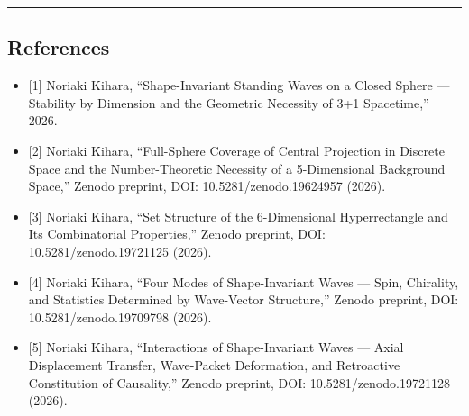 \documentclass[
  a4paper,11pt]{article}
\providecommand{\tightlist}{%
  \setlength{\itemsep}{0pt}\setlength{\parskip}{0pt}}
\theoremstyle{definition}
\theoremstyle{remark}
\begin{document}
\begin{center}\rule{0.5\linewidth}{0.5pt}\end{center}

\subsection{References}\label{references}

\begin{itemize}
\tightlist
\item
  {[}1{]} Noriaki Kihara, ``Shape-Invariant Standing Waves on a Closed
  Sphere --- Stability by Dimension and the Geometric Necessity of 3+1
  Spacetime,'' 2026.
\item
  {[}2{]} Noriaki Kihara, ``Full-Sphere Coverage of Central Projection
  in Discrete Space and the Number-Theoretic Necessity of a
  5-Dimensional Background Space,'' Zenodo preprint, DOI:
  10.5281/zenodo.19624957 (2026).
\item
  {[}3{]} Noriaki Kihara, ``Set Structure of the 6-Dimensional
  Hyperrectangle and Its Combinatorial Properties,'' Zenodo preprint,
  DOI: 10.5281/zenodo.19721125 (2026).
\item
  {[}4{]} Noriaki Kihara, ``Four Modes of Shape-Invariant Waves ---
  Spin, Chirality, and Statistics Determined by Wave-Vector Structure,''
  Zenodo preprint, DOI: 10.5281/zenodo.19709798 (2026).
\item
  {[}5{]} Noriaki Kihara, ``Interactions of Shape-Invariant Waves ---
  Axial Displacement Transfer, Wave-Packet Deformation, and Retroactive
  Constitution of Causality,'' Zenodo preprint, DOI:
  10.5281/zenodo.19721128 (2026).
\end{itemize}
\end{document}
